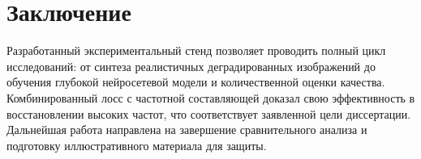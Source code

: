 \documentclass[12pt,a4paper]{article}
\begin{document}
\section*{Заключение}
Разработанный экспериментальный стенд позволяет проводить полный цикл исследований: от синтеза реалистичных деградированных изображений до обучения глубокой нейросетевой модели и количественной оценки качества. Комбинированный лосс с частотной составляющей доказал свою эффективность в восстановлении высоких частот, что соответствует заявленной цели диссертации. Дальнейшая работа направлена на завершение сравнительного анализа и подготовку иллюстративного материала для защиты.
\end{document}
